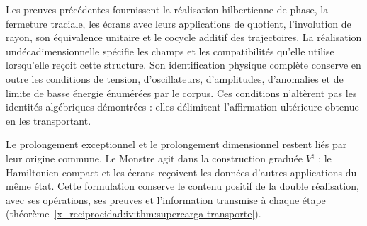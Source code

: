 Les preuves précédentes fournissent la réalisation
hilbertienne de phase, la fermeture traciale, les écrans
avec leurs applications de quotient, l’involution de rayon,
son équivalence unitaire et le cocycle additif des
trajectoires. La réalisation undécadimensionnelle
spécifie les champs et les compatibilités qu’elle
utilise lorsqu’elle reçoit cette structure. Son identification
physique complète conserve en outre les conditions
de tension, d’oscillateurs, d’amplitudes, d’anomalies et de
limite de basse énergie énumérées par le corpus.
Ces conditions n’altèrent pas les identités
algébriques démontrées : elles délimitent l’affirmation
ultérieure obtenue en les transportant.

Le prolongement exceptionnel et le prolongement dimensionnel
restent liés par leur origine commune. Le
Monstre agit dans la construction graduée
\(V^\natural\) ; le Hamiltonien compact et les
écrans reçoivent les données d’autres applications du
même état. Cette formulation conserve le
contenu positif de la double réalisation,
avec ses opérations, ses preuves et l’information
transmise à chaque étape (théorème~\ref{x_reciprocidad:iv:thm:supercarga-transporte}).
